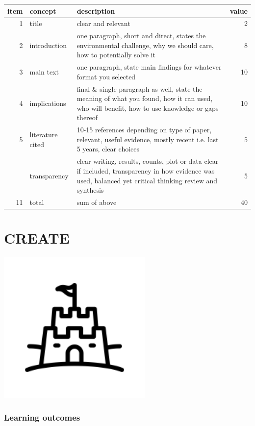\documentclass[
]{book}
\begin{document}
\begin{tabular}{rllr}
\toprule
item & concept & description & value\\
\midrule
1 & title & clear and relevant & 2\\
2 & introduction & one paragraph, short and direct, states the environmental challenge, why we should care, how to potentially solve it & 8\\
3 & main text & one paragraph, state main findings for whatever format you selected & 10\\
4 & implications & final \& single paragraph as well, state the meaning of what you found, how it can used, who will benefit, how to use knowledge or gaps thereof & 10\\
5 & literature cited & 10-15 references depending on type of paper, relevant, useful evidence, mostly recent i.e. last 5 years, clear choices & 5\\
\addlinespace
6 & transparency & clear writing, results, counts, plot or data clear if included, transparency in how evidence was used, balanced yet critical thinking review and synthesis & 5\\
11 & total & sum of above & 40\\
\bottomrule
\end{tabular}

\hypertarget{create}{%
\chapter{CREATE}\label{create}}

\includegraphics[width=3in,height=\textheight]{./castle.png}

\hypertarget{learning-outcomes-11}{%
\subsection*{Learning outcomes}\label{learning-outcomes-11}}
\end{document}
